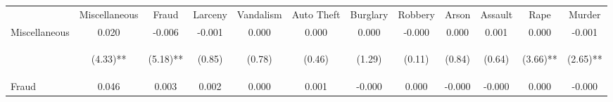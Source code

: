 \begin{tabular}{lccccccccccc}
\hline\hline \noalign{\smallskip} & Miscellaneous & Fraud & Larceny & Vandalism & Auto Theft & Burglary & Robbery & Arson & Assault & Rape & Murder\\
\noalign{\smallskip}\hline \noalign{\smallskip}Miscellaneous & 0.020 & -0.006 & -0.001 & 0.000 & 0.000 & 0.000 & -0.000 & 0.000 & 0.001 & 0.000 & -0.001\\
 & \begin{footnotesize}(4.33)**\end{footnotesize} & \begin{footnotesize}(5.18)**\end{footnotesize} & \begin{footnotesize}(0.85)\end{footnotesize} & \begin{footnotesize}(0.78)\end{footnotesize} & \begin{footnotesize}(0.46)\end{footnotesize} & \begin{footnotesize}(1.29)\end{footnotesize} & \begin{footnotesize}(0.11)\end{footnotesize} & \begin{footnotesize}(0.84)\end{footnotesize} & \begin{footnotesize}(0.64)\end{footnotesize} & \begin{footnotesize}(3.66)**\end{footnotesize} & \begin{footnotesize}(2.65)**\end{footnotesize}\\
\noalign{\smallskip}Fraud & 0.046 & 0.003 & 0.002 & 0.000 & 0.001 & -0.000 & 0.000 & -0.000 & -0.000 & 0.000 & -0.000\\

\end{tabular}
